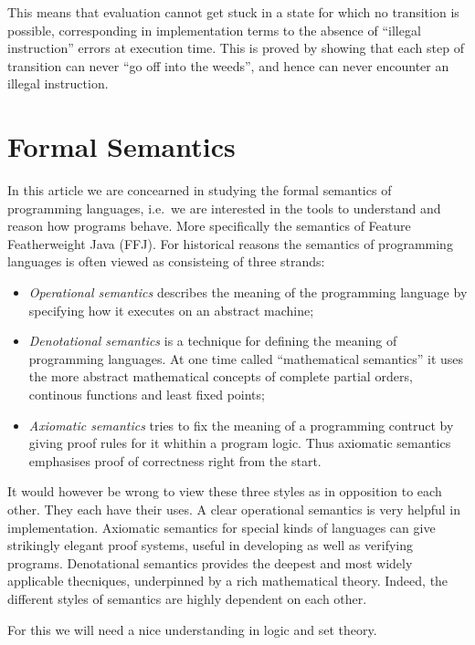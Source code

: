 This means that evaluation cannot get stuck in a state for which no
transition is possible, corresponding in implementation terms to the
absence of ``illegal instruction'' errors at execution time. This is proved
by showing that each step of transition can never ``go off into the
weeds'', and hence can never encounter an illegal instruction.


\section{Formal Semantics} 
In this article we are concearned in studying the formal semantics of
programming languages, i.e.\ we are interested in the tools to understand and
reason how programs behave. More specifically the semantics of Feature
Featherweight Java (FFJ).  For historical reasons the semantics of programming
languages is often viewed as consisteing of three strands: 

\begin{itemize} 
    \item \textit{Operational semantics} describes the meaning of the
        programming language by specifying how it executes on an abstract machine;

    \item \textit{Denotational semantics} is a technique for defining the
    meaning of programming languages. At one time called ``mathematical
    semantics'' it uses the more abstract mathematical concepts of complete
    partial orders, continous functions and least fixed points; 

    \item \textit{Axiomatic semantics} tries to fix the meaning of a programming
        contruct by giving proof rules for it whithin a program logic. Thus
        axiomatic semantics emphasises proof of correctness right from the start.
\end{itemize}

It would however be wrong to view these three styles as in opposition to
each other. They each have their uses. A clear operational semantics is very
helpful in implementation. Axiomatic semantics for special kinds of
languages can give strikingly elegant proof systems, useful in developing as
well as verifying programs. Denotational semantics provides the deepest and
most widely applicable thecniques, underpinned by a rich mathematical
theory. Indeed, the different styles  of semantics are highly dependent on
each other. 

For this we will need a nice understanding in logic and set theory.



